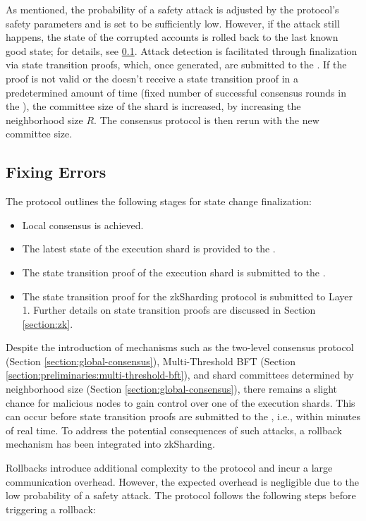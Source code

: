 As mentioned, the probability of a safety attack is adjusted by the protocol's safety parameters and is set to be sufficiently low.
However, if the attack still happens, the state of the corrupted accounts is rolled back to the last known good state; for details, see \ref{section:rollbacks}.
Attack detection is facilitated through finalization via state transition proofs, which, once generated, are submitted to the \mainshard.
If the proof is not valid or the \mainshard doesn't receive a state transition proof in a predetermined amount of time (fixed number of successful consensus rounds in the \mainshard),
the committee size of the shard is increased, by increasing the neighborhood size $R$. The consensus protocol is then rerun with the new committee size.


\subsection{Fixing Errors}
\label{section:rollbacks}

The protocol outlines the following stages for state change finalization:
\begin{itemize}
\item Local consensus is achieved.
\item The latest state of the execution shard is provided to the \mainshard.
\item The state transition proof of the execution shard is submitted to the \mainshard.
\item The state transition proof for the zkSharding protocol is submitted to Layer 1.
    Further details on state transition proofs are discussed in Section \ref{section:zk}.
\end{itemize}

Despite the introduction of mechanisms such as 
 the two-level consensus protocol (Section \ref{section:global-consensus}), 
 Multi-Threshold BFT (Section \ref{section:preliminaries:multi-threshold-bft}), 
 and shard committees determined by neighborhood size (Section \ref{section:global-consensus}), 
 there remains a slight chance for malicious nodes to gain control over one of the execution shards.
This can occur before state transition proofs are submitted to the \mainshard, i.e., 
 within minutes of real time. 
To address the potential consequences of such attacks, 
 a rollback mechanism has been integrated into zkSharding.

Rollbacks introduce additional complexity to the protocol and incur a large communication overhead.
However, the expected overhead is negligible due to the low probability of a safety attack.
The protocol follows the following steps before triggering a rollback:

